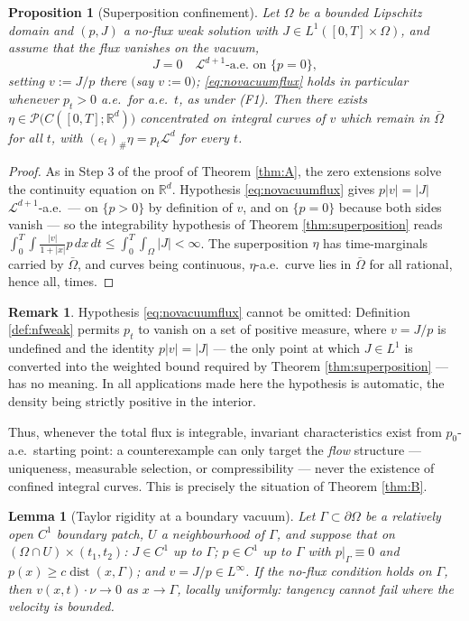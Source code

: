 \documentclass[11pt]{amsart}
\newtheorem{proposition}[theorem]{Proposition}
\newtheorem{lemma}[theorem]{Lemma}
\theoremstyle{definition}
\newtheorem{remark}[theorem]{Remark}
\newcommand{\Ld}{\mathcal{L}^d}
\newcommand{\LL}[1]{\mathcal{L}^{#1}}
\newcommand{\R}{\mathbb{R}}
\newcommand{\PP}{\mathcal{P}}
\newcommand{\dd}{\,d}
\begin{document}
\begin{proposition}[Superposition confinement]\label{prop:conf}
Let $\Omega$ be a bounded Lipschitz domain and $(p,J)$ a no-flux
weak solution with $J\in L^1([0,T]\times\Omega)$, and assume that
the flux vanishes on the vacuum,
\begin{equation}\label{eq:novacuumflux}
J=0 \quad \LL{d+1}\text{-a.e.\ on }\{p=0\},
\end{equation}
setting $v:=J/p$ there $($say $v:=0)$; \eqref{eq:novacuumflux} holds
in particular whenever $p_t>0$ a.e.\ for a.e.\ $t$, as under
\textup{(F1)}. Then there exists
$\eta\in\PP\big(C([0,T];\R^d)\big)$ concentrated on integral curves
of $v$ which remain in $\bar\Omega$ for all $t$, with
$(e_t)_\#\eta=p_t\Ld$ for every $t$.
\end{proposition}

\begin{proof}
As in Step 3 of the proof of Theorem \ref{thm:A}, the zero
extensions solve the continuity equation on $\R^d$. Hypothesis
\eqref{eq:novacuumflux} gives $p|v|=|J|$ $\LL{d+1}$-a.e.\ --- on
$\{p>0\}$ by definition of $v$, and on $\{p=0\}$ because both sides
vanish --- so the integrability hypothesis of Theorem
\ref{thm:superposition} reads
$\int_0^T\!\int\frac{|v|}{1+|x|}p\dd x\dd t\le
\int_0^T\!\int_\Omega|J|<\infty$. The superposition $\eta$ has
time-marginals carried by $\bar\Omega$, and curves being continuous,
$\eta$-a.e.\ curve lies in $\bar\Omega$ for all rational, hence
all, times.
\end{proof}

\begin{remark}\label{rem:vacuumflux}
Hypothesis \eqref{eq:novacuumflux} cannot be omitted: Definition
\ref{def:nfweak} permits $p_t$ to vanish on a set of positive
measure, where $v=J/p$ is undefined and the identity $p|v|=|J|$
--- the only point at which $J\in L^1$ is converted into the
weighted bound required by Theorem \ref{thm:superposition} ---
has no meaning. In all applications made here the hypothesis is
automatic, the density being strictly positive in the interior.
\end{remark}

Thus, whenever the total flux is integrable, invariant
characteristics exist from $p_0$-a.e.\ starting point: a
counterexample can only target the \emph{flow} structure ---
uniqueness, measurable selection, or compressibility --- never the
existence of confined integral curves. This is precisely the
situation of Theorem \ref{thm:B}.

\begin{lemma}[Taylor rigidity at a boundary vacuum]\label{lem:taylor}
Let $\Gamma\subset\partial\Omega$ be a relatively open $C^1$
boundary patch, $U$ a neighbourhood of $\Gamma$, and suppose that on
$(\Omega\cap U)\times(t_1,t_2)$: $J\in C^1$ up to $\Gamma$; $p\in
C^1$ up to $\Gamma$ with $p|_\Gamma\equiv0$ and
$p(x)\ge c\operatorname{dist}(x,\Gamma)$; and $v=J/p\in L^\infty$.
If the no-flux condition holds on $\Gamma$, then
$v(x,t)\cdot\nu\to0$ as $x\to\Gamma$, locally uniformly: tangency
cannot fail where the velocity is bounded.
\end{lemma}
\end{document}
